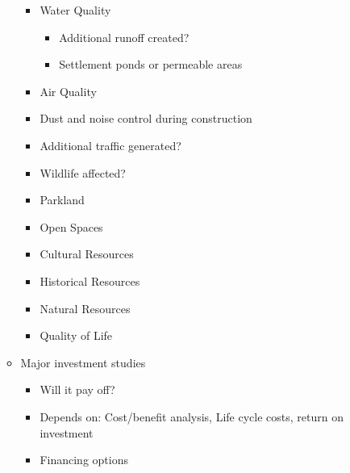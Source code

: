 \documentclass{article}
\begin{document}
\begin{itemize}
\begin{itemize}
        \begin{itemize}
            \item Water Quality
            \begin{itemize}
                \item Additional runoff created?
                \item Settlement ponds or permeable areas
            \end{itemize}
            \item Air Quality
            \item Dust and noise control during construction
            \item Additional traffic generated?
            \item Wildlife affected?
            \item Parkland
            \item Open Spaces
            \item Cultural Resources
            \item Historical Resources
            \item Natural Resources
            \item Quality of Life
        \end{itemize}
        \item Major investment studies
        \begin{itemize}
            \item Will it pay off?
            \item Depends on: Cost/benefit analysis, Life cycle costs, return on investment
            \item Financing options
        \end{itemize}
    \end{itemize}
\end{itemize}
\end{document}
